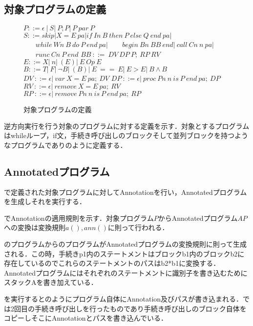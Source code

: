 \documentclass[submit,PRO]{ipsj}
\begin{document}
\subsection{対象プログラムの定義}

\begin{figure}[tb]
\vbox{
\hbox{$P ::= \epsilon\ |\ S |\ P;P |\ P\ par\ P$}
\hbox{$S ::= skip | X = E\ pa | if\ In\ B\ then\ P\ else\ Q\ end\ pa|$}
\hbox{$\ \ \ \ \ \ \ \ while\ Wn\ B\ do\ P\ end\ pa | $}
\hbox{$\ \ \ \ \ \ \ \ begin\ Bn\ BB\ end |\ call\ Cn\ n\ pa|$}
\hbox{$\ \ \ \ \ \ \ \ runc\ Cn\ P\ end$}
\hbox{$BB\ ::=\ DV\ DP\ P;\ RP\ RV$}
\hbox{$E::=X |\ n |\ (E)|\ E\ Op\ E$}
\hbox{$B::=T|\ F|\ \lnot B |\ (B)|\ E\ ==\ E |\ E > E|\ B \land B$}
\hbox{$DV\ ::= \epsilon |\ var\ X=E\ pa;\ DV$}
\hbox{$DP\ ::= \epsilon |\ proc\ Pn\ n\ is\ P\ end\ pa;\ DP$}
\hbox{$RV\ ::=\epsilon |\  remove\ X=E\ pa;\ RV$}
\hbox{$RP\ ::= \epsilon |\ remove\ Pn\ n\ is\ P\ end\ pa;\ RP$}
}
\centerline{}
\caption{対象プログラムの定義}
\label{fig:Hdef}
\end{figure}


逆方向実行を行う対象のプログラムに対する定義を示す．対象とするプログラムはwhileループ，if文，手続き呼び出しのブロックそして並列ブロックを持つようなプログラムでありのように定義する．



\subsection{Annotatedプログラム}

で定義された対象プログラムに対してAnnotationを行い，Annotatedプログラムを生成しそれを実行する．

でAnnotationの適用規則を示す．対象プログラム$P$からAnnotatedプログラム$AP$への変換は変換規則$a(),ann()$に則って行われる．






のプログラムからのプログラムがAnnotatedプログラムの変換規則に則って生成される．この時，手続きp1内のステートメントはブロックb1内のブロックb2に存在しているのでこれらのステートメントのパスはb2*b1に変換する．Annotatedプログラムにはそれぞれのステートメントに識別子を書き込むためにスタックAを書き加えている．




を実行するとのようにプログラム自体にAnnotation及びパスが書き込まれる．では2回目の手続き呼び出しを行ったものであり手続き呼び出しのブロック自体をコピーしそこにAnnotationとパスを書き込んでいる．
\end{document}
